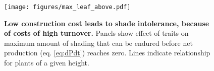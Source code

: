 \documentclass[12pt, a4paper]{article}
\begin{document}
\newpage

\begin{figure}[htbp]
\centering
\texttt{[image: figures/max\_leaf\_above.pdf]}
\caption{\textbf{Low construction cost leads to shade intolerance,
because of costs of high turnover.} Panels show effect of traits on
maximum amount of shading that can be endured before net production (eq.
\ref{eq:dPdt}) reaches zero. Lines indicate relationship for plants of a
given height. \label{f-wplcp}}
\end{figure}

\newpage


\end{document}

